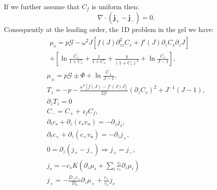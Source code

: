 \documentclass[12pt]{extarticle}
\begin{document}
If we further assume that $C_f$ is uniform then:
\begin{equation}
\nabla\cdot(\mathbf{j}_+-\mathbf{j}_-)= 0.
\end{equation}
Consequently at the leading order, the 1D problem in the gel we have:
\begin{gather}
\begin{aligned}
\mu_s = p \mathcal{G}  - \omega^2 J \left[f(J)\partial_{zz}^2 C_s+f'(J)\partial_z C_s\partial_z J\right]\\
+ \left[\ln \frac{C_s}{1+C_s} + \frac{1}{1+C_s}+\frac{\chi}{(1+C_s)^2} + \ln \frac{C_s}{J-1} \right], 
\end{aligned}\\[2.5mm]
\mu_\pm = p \mathcal{G} \pm \Phi + \ln \frac{C_\pm}{J-1} ,\\
T_z= -p -\frac{\omega^2 \left[f(J)-f'(J)J\right]}{2\mathcal{G}} (\partial_z C_s)^2+ J^{-1}\left(J-1\right),\\
\partial_z T_z=0\\
C_- = C_+ + z_f C_f,\\
\partial_t c_s + \partial_z (c_s v_n)=- \partial_z j_s,\\
\partial_t c_+ +\partial_z (c_+ v_n)= -\partial_zj_+,\\
0= \partial_z(j_+-j_-) \Rightarrow j_+=j_-,\\
j_s =-c_sK  \left(\partial_z\mu_s +\sum_i \frac{c_i}{c_s} \partial_z \mu_i\right)\\
j_+= - \frac{D_+ c_+}{D_0}\partial_z \mu_+ + \frac{c_+}{c_s}j_s
\end{gather}
\end{document}
